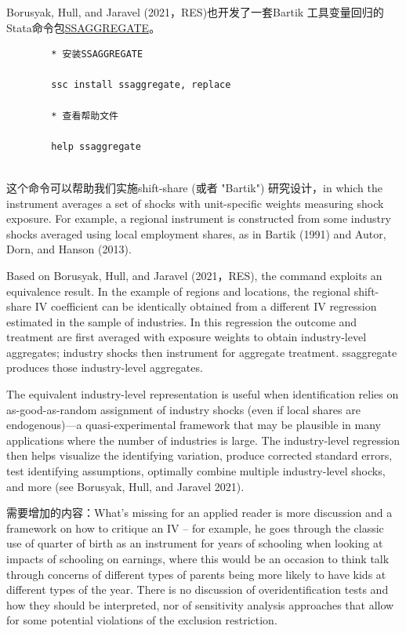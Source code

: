 \documentclass[cn,12pt,math=newtx,citestyle=gb7714-2015,bibstyle=gb7714-2015]{elegantbook}
\begin{document}
	Borusyak, Hull, and Jaravel (2021，RES)也开发了一套Bartik
	工具变量回归的Stata命令包\href{https://ideas.repec.org/c/boc/bocode/s458526.html}{SSAGGREGATE}。
	
	\begin{lstlisting}
		* 安装SSAGGREGATE
		
		ssc install ssaggregate, replace
		
		* 查看帮助文件
		
		help ssaggregate
		
	\end{lstlisting}

这个命令可以帮助我们实施shift-share (或者 "Bartik") 研究设计，in which the instrument averages a set of shocks with unit-specific weights measuring shock exposure. For example, a regional instrument is constructed from some industry shocks averaged using local employment shares, as in Bartik (1991) and Autor, Dorn, and Hanson (2013).

Based on Borusyak, Hull, and Jaravel (2021，RES), the command exploits an equivalence result. In the example of regions and locations, the regional shift-share IV coefficient can be identically obtained from a different IV regression estimated in the sample of industries. In this regression the outcome and treatment are first averaged with exposure weights to obtain industry-level aggregates; industry shocks then instrument for aggregate treatment. ssaggregate produces those industry-level aggregates.

The equivalent industry-level representation is useful when identification relies on as-good-as-random assignment of industry shocks (even if local shares are endogenous)---a quasi-experimental framework that may be plausible in many applications where the number of industries is large. The industry-level regression then helps visualize the identifying variation, produce corrected standard errors, test identifying assumptions, optimally combine multiple industry-level shocks, and more (see Borusyak, Hull, and Jaravel 2021).

	
需要增加的内容：What’s missing for an applied reader is more discussion and a framework on how to critique an IV – for example, he goes through the classic use of quarter of birth as an instrument for years of schooling when looking at impacts of schooling on earnings, where this would be an occasion to think talk through concerns of different types of parents being more likely to have kids at different types of the year. There is no discussion of overidentification tests and how they should be interpreted, nor of sensitivity analysis approaches that allow for some potential violations of the exclusion restriction.
	
\end{document}
